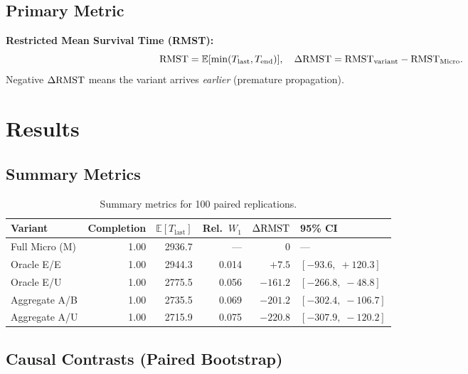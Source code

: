 \documentclass[11pt,a4paper]{article}
\begin{document}
\subsection{Primary Metric}

\textbf{Restricted Mean Survival Time (RMST):}
\[
  \mathrm{RMST} = \mathbb{E}[\min(T_{\mathrm{last}}, T_{\mathrm{end}})],
  \quad
  \Delta\mathrm{RMST} = \mathrm{RMST}_{\mathrm{variant}} - \mathrm{RMST}_{\mathrm{Micro}}.
\]
Negative $\Delta\mathrm{RMST}$ means the variant arrives \emph{earlier} (premature propagation).

\section{Results}

\subsection{Summary Metrics}

\begin{table}[H]
\centering
\begin{tabular}{lrrrrl}
\toprule
Variant & Completion & $\mathbb{E}[T_{\mathrm{last}}]$ & Rel.\ $W_1$ & $\Delta\mathrm{RMST}$ & 95\% CI \\
\midrule
Full Micro (M)   & 1.00 & 2936.7 & --- & $0$ & --- \\
Oracle E/E       & 1.00 & 2944.3 & 0.014 & $+7.5$   & $[-93.6,\;+120.3]$ \\
Oracle E/U       & 1.00 & 2775.5 & 0.056 & $-161.2$ & $[-266.8,\;-48.8]$ \\
Aggregate A/B    & 1.00 & 2735.5 & 0.069 & $-201.2$ & $[-302.4,\;-106.7]$ \\
Aggregate A/U    & 1.00 & 2715.9 & 0.075 & $-220.8$ & $[-307.9,\;-120.2]$ \\
\bottomrule
\end{tabular}
\caption{Summary metrics for 100 paired replications.}
\label{tab:summary}
\end{table}

\subsection{Causal Contrasts (Paired Bootstrap)}
\end{document}
